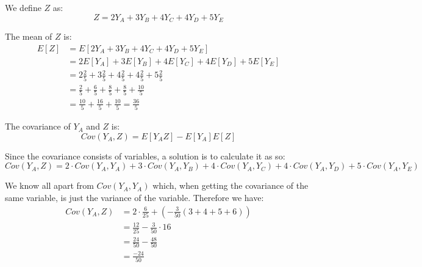 We define $Z$ as:
\[
	Z = 2Y_A + 3Y_B + 4Y_C + 4Y_D + 5Y_E
\]

The mean of $Z$ is:
\begin{align*}
	E[Z] & = E[2Y_A + 3Y_B + 4Y_C + 4Y_D + 5Y_E]                                      \\
	     & = 2E[Y_A] + 3E[Y_B] + 4E[Y_C] + 4E[Y_D] + 5E[Y_E]                          \\
	     & = 2\frac{2}{5} + 3\frac{2}{5} + 4\frac{2}{5} + 4\frac{2}{5} + 5\frac{2}{5} \\
	     & = \frac{2}{5} + \frac{6}{5} + \frac{8}{5} + \frac{8}{5} + \frac{10}{5}     \\
	     & = \frac{10}{5} + \frac{16}{5} + \frac{10}{5} = \frac{36}{5}
\end{align*}

The covariance of $Y_A$ and $Z$ is:
\[
	Cov(Y_A, Z) = E[Y_AZ] - E[Y_A]E[Z]
\]

Since the covariance consists of variables, a solution is to calculate it as so:
\[
	Cov(Y_A, Z) = 2\cdot Cov(Y_A, Y_A) + 3\cdot Cov(Y_A, Y_B) + 4\cdot Cov(Y_A, Y_C) + 4\cdot Cov(Y_A, Y_D) + 5\cdot Cov(Y_A, Y_E)
\]

We know all apart from $Cov(Y_A, Y_A)$ which, when getting the covariance of the same variable, is just the variance of the variable. Therefore we have:
\begin{align*}
	Cov(Y_A, Z) & = 2\cdot \frac{6}{25} + (-\frac{3}{50}(3+4+5+6)) \\
	            & = \frac{12}{25} - \frac{3}{50} \cdot 16          \\
	            & = \frac{24}{50} - \frac{48}{50}                  \\
	            & = \frac{-24}{50}
\end{align*}



